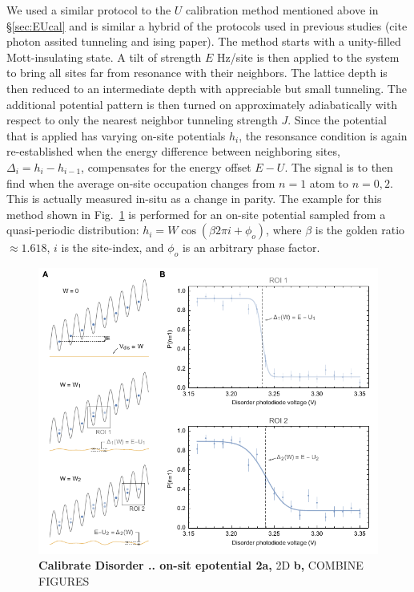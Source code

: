 We used a similar protocol to the $U$ calibration method mentioned above in \S \ref{sec:EUcal} and is similar a hybrid of the protocols used in previous studies (cite photon assited tunneling and ising paper). The method starts with a unity-filled Mott-insulating state. A tilt of strength $E$ Hz/site is then applied to the system to bring all sites far from resonance with their neighbors. The lattice depth is then reduced to an intermediate depth with appreciable but small tunneling. The additional potential pattern is then turned on approximately adiabatically with respect to only the nearest neighbor tunneling strength $J$. Since the potential that is applied has varying on-site potentials $h_i$, the resonsance condition is again re-established when the energy difference between neighboring sites, $\Delta_i = h_i - h_{i-1}$, compensates for the energy offset $E-U$. The signal is to then find when the average on-site occupation changes from $n=1$ atom to $n=0,2$. This is actually measured in-situ as a change in parity. The example for this method shown in Fig.~\ref{fig:WCal} is performed for an on-site potential sampled from a quasi-periodic distribution: $h_i = W \cos{\left ( \beta 2 \pi i + \phi_o \right ) }$, where $\beta$ is the golden ratio $\approx 1.618$, $i$ is the site-index, and $\phi_o$ is an arbitrary phase factor.

\begin{figure}[h!]
		\includegraphics[width=\columnwidth]{figures/ch2/disorder_cal/WCal.pdf} 
		\caption{\textbf{Calibrate Disorder .. on-sit epotential 2a,}  2D \textbf{b,} COMBINE FIGURES }
		\label{fig:WCal}	
\end{figure}

